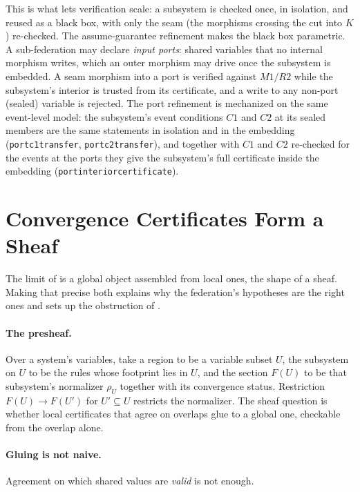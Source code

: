 \documentclass[11pt,a4paper]{article}
\theoremstyle{plain}
\theoremstyle{definition}
\theoremstyle{remark}
\renewcommand{\_}{\origunderscore\allowbreak}
\begin{document}
This is what lets verification scale: a subsystem is checked once, in isolation, and reused as a
black box, with only the seam (the morphisms crossing the cut into $K$) re-checked. The
assume-guarantee refinement makes the black box parametric. A sub-federation may declare \emph{input
ports}: shared variables that no internal morphism writes, which an outer morphism may drive once the
subsystem is embedded. A seam morphism into a port is verified against $M1/R2$ while the subsystem's
interior is trusted from its certificate, and a write to any non-port (sealed) variable is rejected.
The port refinement is mechanized on the same event-level model: the subsystem's event conditions
$C1$ and $C2$ at its sealed members are the same statements in isolation and in the embedding
(\texttt{port\_c1\_transfer}, \texttt{port\_c2\_transfer}), and together with $C1$ and $C2$
re-checked for the events at the ports they give the subsystem's full certificate inside the
embedding (\texttt{port\_interior\_certificate}).

\section{Convergence Certificates Form a Sheaf}
\label{sec:sheaf}

The limit of  is a global object assembled from local ones, the shape of a sheaf.
Making that precise both explains why the federation's hypotheses are the right ones and sets up the
obstruction of .

\paragraph{The presheaf.} Over a system's variables, take a region to be a variable subset $U$, the
subsystem on $U$ to be the rules whose footprint lies in $U$, and the section $F(U)$ to be that
subsystem's normalizer $\rho_U$ together with its convergence status. Restriction $F(U) \to F(U')$
for $U' \subseteq U$ restricts the normalizer. The sheaf question is whether local certificates that
agree on overlaps glue to a global one, checkable from the overlap alone.

\paragraph{Gluing is not naive.} Agreement on which shared values are \emph{valid} is not enough.
\end{document}
